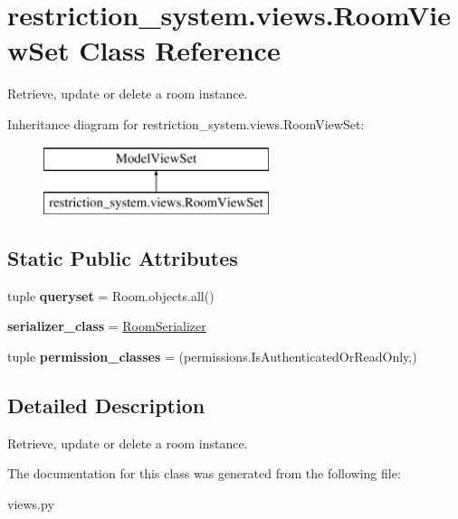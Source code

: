 \hypertarget{classrestriction__system_1_1views_1_1RoomViewSet}{}\section{restriction\+\_\+system.\+views.\+Room\+View\+Set Class Reference}
\label{classrestriction__system_1_1views_1_1RoomViewSet}


Retrieve, update or delete a room instance.  


Inheritance diagram for restriction\+\_\+system.\+views.\+Room\+View\+Set\+:\begin{figure}[H]
\begin{center}
\leavevmode
\includegraphics[height=2.000000cm]{classrestriction__system_1_1views_1_1RoomViewSet}
\end{center}
\end{figure}
\subsection*{Static Public Attributes}
\begin{DoxyCompactItemize}
\item 
\hypertarget{classrestriction__system_1_1views_1_1RoomViewSet_a8f03aba05809d93c89da9bc953d42a6e}{}tuple {\bfseries queryset} = Room.\+objects.\+all()\label{classrestriction__system_1_1views_1_1RoomViewSet_a8f03aba05809d93c89da9bc953d42a6e}

\item 
\hypertarget{classrestriction__system_1_1views_1_1RoomViewSet_aad30cf7c7c5df39e1dbe80de6dcc3b7e}{}{\bfseries serializer\+\_\+class} = \hyperlink{classrestriction__system_1_1serializers_1_1RoomSerializer}{Room\+Serializer}\label{classrestriction__system_1_1views_1_1RoomViewSet_aad30cf7c7c5df39e1dbe80de6dcc3b7e}

\item 
\hypertarget{classrestriction__system_1_1views_1_1RoomViewSet_aa9495f7241e8943698e6328d445a24c5}{}tuple {\bfseries permission\+\_\+classes} = (permissions.\+Is\+Authenticated\+Or\+Read\+Only,)\label{classrestriction__system_1_1views_1_1RoomViewSet_aa9495f7241e8943698e6328d445a24c5}

\end{DoxyCompactItemize}


\subsection{Detailed Description}
Retrieve, update or delete a room instance. 



The documentation for this class was generated from the following file\+:\begin{DoxyCompactItemize}
\item 
views.\+py\end{DoxyCompactItemize}
